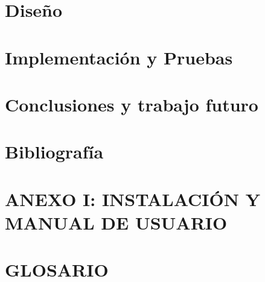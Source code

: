 \documentclass[b5paper,10pt,twoside]{book}
\begin{document}
	\chapter{Diseño}
	
	
	
	\chapter{Implementación y Pruebas}
	
	
	
	\chapter{Conclusiones y trabajo futuro}
	
	
	
	\chapter{Bibliografía}
	
	
	
	\chapter*{ANEXO I: INSTALACIÓN Y MANUAL DE USUARIO }
		
	
	
	\chapter*{GLOSARIO}
	
	
\end{document}
